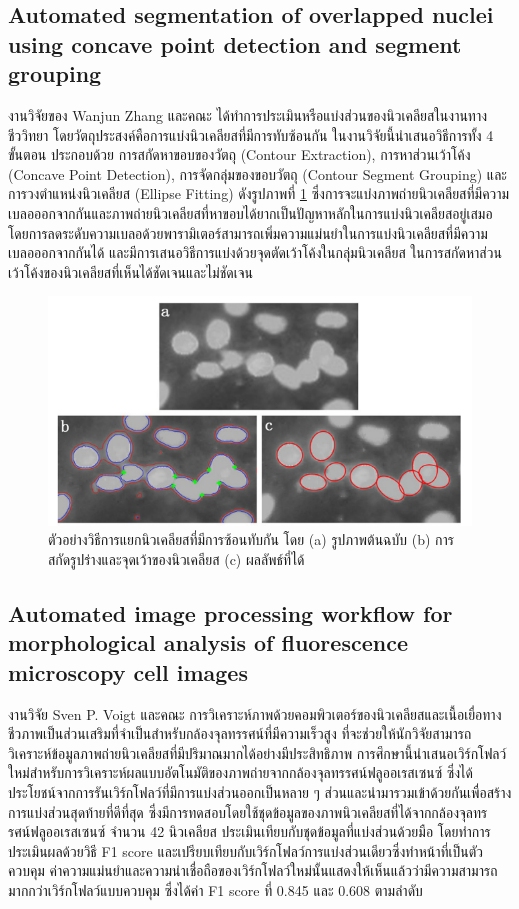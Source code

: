 \documentclass[12pt,oneside,openright,a4paper]{cpe-thai-project}
\begin{document}
\subsection{Automated segmentation of overlapped nuclei using concave point detection and segment grouping}
งานวิจัยของ  Wanjun Zhang และคณะ \cite{31} ได้ทำการประเมินหรือแบ่งส่วนของนิวเคลียสในงานทางชีววิทยา โดยวัตถุประสงค์คือการแบ่งนิวเคลียสที่มีการทับซ้อนกัน ในงานวิจัยนี้นำเสนอวิธีการทั้ง 4 ขั้นตอน ประกอบด้วย การสกัดหาขอบของวัตถุ (Contour Extraction), การหาส่วนเว้าโค้ง (Concave Point Detection), การจัดกลุ่มของขอบวัตถุ (Contour Segment Grouping) และ การวงตำแหน่งนิวเคลียส (Ellipse Fitting) ดังรูปภาพที่ \ref{fig:automated segment}  ซึ่งการจะแบ่งภาพถ่ายนิวเคลียสที่มีความเบลอออกจากกันและภาพถ่ายนิวเคลียสที่หาขอบได้ยากเป็นปัญหาหลักในการแบ่งนิวเคลียสอยู่เสมอ โดยการลดระดับความเบลอด้วยพารามิเตอร์สามารถเพิ่มความแม่นยำในการแบ่งนิวเคลียสที่มีความเบลอออกจากกันได้ และมีการเสนอวิธีการแบ่งด้วยจุดตัดเว้าโค้งในกลุ่มนิวเคลียส ในการสกัดหาส่วนเว้าโค้งของนิวเคลียสที่เห็นได้ชัดเจนและไม่ชัดเจน 
 \begin{figure}[!h]
    \centering
    \includegraphics[scale=0.8]{images/paper-Automated segmentation.png}
    \caption[รูปตัวอย่างจากเปเปอร์ automated segment]{ตัวอย่างวิธีการแยกนิวเคลียสที่มีการซ้อนทับกัน โดย (a) รูปภาพต้นฉบับ (b) การสกัดรูปร่างและจุดเว้าของนิวเคลียส (c) ผลลัพธ์ที่ได้}
    \label{fig:automated segment}
\end{figure}
\subsection{Automated image processing workflow for morphological analysis of fluorescence microscopy cell images}
งานวิจัย Sven P. Voigt และคณะ \cite{32} การวิเคราะห์ภาพด้วยคอมพิวเตอร์ของนิวเคลียสและเนื้อเยื่อทางชีวภาพเป็นส่วนเสริมที่จำเป็นสำหรับกล้องจุลทรรศน์ที่มีความเร็วสูง ที่จะช่วยให้นักวิจัยสามารถวิเคราะห์ข้อมูลภาพถ่ายนิวเคลียสที่มีปริมาณมากได้อย่างมีประสิทธิภาพ การศึกษานี้นำเสนอเวิร์กโฟลว์ใหม่สำหรับการวิเคราะห์ผลแบบอัตโนมัติของภาพถ่ายจากกล้องจุลทรรศน์ฟลูออเรสเซนซ์ ซึ่งได้ประโยชน์จากการรันเวิร์กโฟลว์ที่มีการแบ่งส่วนออกเป็นหลาย ๆ ส่วนและนำมารวมเข้าด้วยกันเพื่อสร้างการแบ่งส่วนสุดท้ายที่ดีที่สุด ซึ่งมีการทดสอบโดยใช้ชุดข้อมูลของภาพนิวเคลียสที่ได้จากกล้องจุลทรรศน์ฟลูออเรสเซนซ์ จำนวน 42 นิวเคลียส ประเมินเทียบกับชุดข้อมูลที่แบ่งส่วนด้วยมือ โดยทำการประเมินผลด้วยวิธี F1 score และเปรียบเทียบกับเวิร์กโฟลว์การแบ่งส่วนเดียวซึ่งทำหน้าที่เป็นตัวควบคุม ค่าความแม่นยำและความน่าเชื่อถือของเวิร์กโฟลว์ใหม่นั้นแสดงให้เห็นแล้วว่ามีความสามารถมากกว่าเวิร์กโฟลว์แบบควบคุม ซึ่งได้ค่า F1 score ที่ 0.845 และ 0.608 ตามลำดับ
\end{document}
